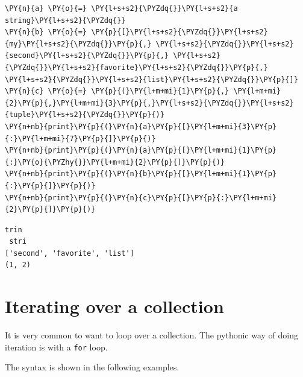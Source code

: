 \begin{Verbatim}[commandchars=\\\{\}]
\PY{n}{a} \PY{o}{=} \PY{l+s+s2}{\PYZdq{}}\PY{l+s+s2}{a string}\PY{l+s+s2}{\PYZdq{}}
\PY{n}{b} \PY{o}{=} \PY{p}{[}\PY{l+s+s2}{\PYZdq{}}\PY{l+s+s2}{my}\PY{l+s+s2}{\PYZdq{}}\PY{p}{,} \PY{l+s+s2}{\PYZdq{}}\PY{l+s+s2}{second}\PY{l+s+s2}{\PYZdq{}}\PY{p}{,} \PY{l+s+s2}{\PYZdq{}}\PY{l+s+s2}{favorite}\PY{l+s+s2}{\PYZdq{}}\PY{p}{,} \PY{l+s+s2}{\PYZdq{}}\PY{l+s+s2}{list}\PY{l+s+s2}{\PYZdq{}}\PY{p}{]}
\PY{n}{c} \PY{o}{=} \PY{p}{(}\PY{l+m+mi}{1}\PY{p}{,} \PY{l+m+mi}{2}\PY{p}{,}\PY{l+m+mi}{3}\PY{p}{,}\PY{l+s+s2}{\PYZdq{}}\PY{l+s+s2}{tuple}\PY{l+s+s2}{\PYZdq{}}\PY{p}{)}
\PY{n+nb}{print}\PY{p}{(}\PY{n}{a}\PY{p}{[}\PY{l+m+mi}{3}\PY{p}{:}\PY{l+m+mi}{7}\PY{p}{]}\PY{p}{)}
\PY{n+nb}{print}\PY{p}{(}\PY{n}{a}\PY{p}{[}\PY{l+m+mi}{1}\PY{p}{:}\PY{o}{\PYZhy{}}\PY{l+m+mi}{2}\PY{p}{]}\PY{p}{)}
\PY{n+nb}{print}\PY{p}{(}\PY{n}{b}\PY{p}{[}\PY{l+m+mi}{1}\PY{p}{:}\PY{p}{]}\PY{p}{)}
\PY{n+nb}{print}\PY{p}{(}\PY{n}{c}\PY{p}{[}\PY{p}{:}\PY{l+m+mi}{2}\PY{p}{]}\PY{p}{)}
\end{Verbatim}

\begin{Verbatim}
trin
 stri
['second', 'favorite', 'list']
(1, 2)
\end{Verbatim}

\section{Iterating over a collection}


It is very common to want to loop over a collection.
The pythonic way of doing iteration is with a \texttt{for} loop.


The syntax is shown in the following examples.

